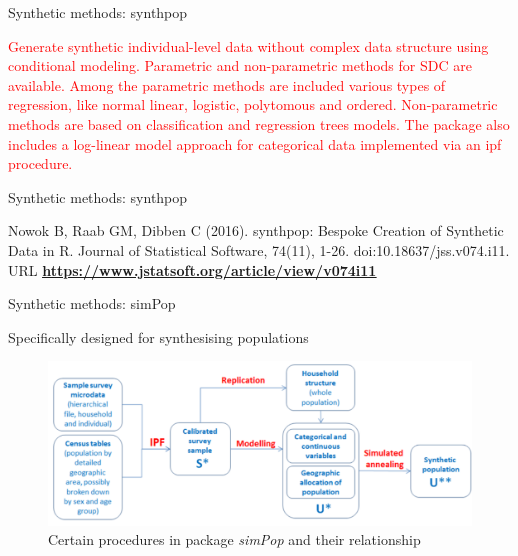 \documentclass[
	aspectratio = 169
 ]{beamer}
\begin{document}
\begin{frame}{Synthetic methods: synthpop}

\textcolor{red}{Generate synthetic individual-level data without complex data structure using conditional
modeling. Parametric and non-parametric methods for SDC are available. Among the parametric methods are
included various types of regression, like normal linear, logistic, polytomous
and ordered. Non-parametric methods are based on classification and regression trees models. The package also includes a log-linear model approach for
categorical data implemented via an ipf procedure.}

\end{frame}
\begin{frame}{Synthetic methods: synthpop}

Nowok B, Raab GM, Dibben C (2016). synthpop: Bespoke Creation of
Synthetic Data in R. Journal of Statistical Software, 74(11), 1-26.
doi:10.18637/jss.v074.i11. URL
\href{https://www.jstatsoft.org/article/view/v074i11}{\color{blue}\underline{\textbf{https://www.jstatsoft.org/article/view/v074i11}}}

\end{frame}
\begin{frame}{Synthetic methods: simPop}

Specifically designed for synthesising populations 

\begin{figure}
    \centering
    \includegraphics[width=\textwidth]{Presentation TEX/gallery/pipeline_simPop.png}
    \caption{Certain procedures in package \emph{simPop} and their
relationship}
\end{figure}

\end{frame}
\end{document}
